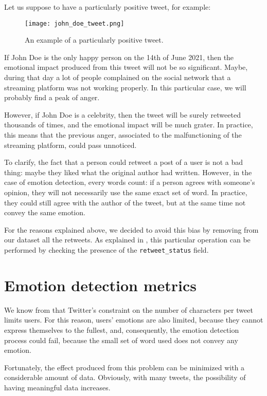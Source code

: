 Let us suppose to have a particularly positive tweet, for example:

\begin{figure}[H]
	\centering
    	\texttt{[image: john\_doe\_tweet.png]}
    	\caption{An example of a particularly positive tweet.}
    	\label{fig:tweet-example}
\end{figure}

If John Doe is the only happy person on the 14th of June 2021, then the emotional impact produced from this tweet will not be so significant. Maybe, during that day a lot of people complained on the social network that a streaming platform was not working properly. In this particular case, we will probably find a peak of anger.

However, if John Doe is a celebrity, then the tweet will be surely retweeted thousands of times, and the emotional impact will be much grater. In practice, this means that the previous anger, associated to the malfunctioning of the streaming platform, could pass unnoticed.

To clarify, the fact that a person could retweet a post of a user is not a bad thing: maybe they liked what the original author had written. However, in the case of emotion detection, every words count: if a person agrees with someone's opinion, they will not necessarily use the same exact set of word. In practice, they could still agree with the author of the tweet, but at the same time not convey the same emotion.

For the reasons explained above, we decided to avoid this bias by removing from our dataset all the retweets. As explained in , this particular operation can be performed by checking the presence of the \texttt{retweet\_status} field. 

\section{Emotion detection metrics}
\label{sec:metrics}

We know from  that Twitter's constraint on the number of characters per tweet limits users. For this reason, users' emotions are also limited, because they cannot express themselves to the fullest, and, consequently, the emotion detection process could fail, because the small set of word used does not convey any emotion. 

Fortunately, the effect produced from this problem can be minimized with a considerable amount of data. Obviously, with many tweets, the possibility of having meaningful data increases.

